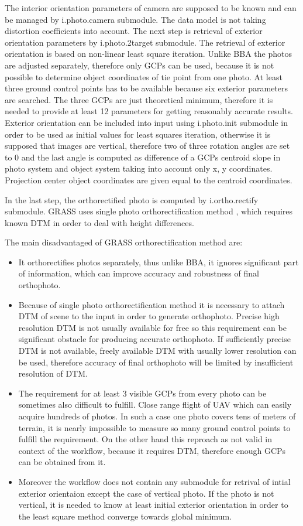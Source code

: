 \documentclass[a4paper,12pt]{article}
\begin{document}
The interior orientation parameters of camera are supposed to be known and can 
be managed by i.photo.camera submodule.
The data model is not taking distortion 
coefficients into account. 
The next step is retrieval of exterior orientation parameters by i.photo.2target submodule.  
The retrieval 
of exterior orientation is based on non-linear least square iteration. Unlike BBA
the photos are adjusted separately, therefore only GCPs can be used,
because it is not possible to determine object coordinates of tie point from one photo.
At least three ground control points has to be available because six exterior parameters are 
searched. The three GCPs are just theoretical minimum, therefore it is needed to provide at least 12 parameters
for getting reasonably accurate results. Exterior orientation 
can be included into input using i.photo.init submodule in order to be used as initial values for least squares iteration,
otherwise it is supposed that images are vertical, therefore two of three rotation
angles are set to 0 and the last angle is computed as difference of a GCPs centroid  slope
in photo system and object system taking into account only x, y coordinates.
Projection center object coordinates are given equal to the centroid coordinates.

In the last step, the orthorectified photo is computed by i.ortho.rectify submodule. GRASS uses single photo orthorectification
method \label{sec:single_ortho}, which requires known DTM in order to deal with height differences. 

The main disadvantaged of GRASS orthorectification method are:
\begin{itemize}
\item It orthorectifies photos separately, thus unlike BBA, it ignores significant part of information,
 which can improve accuracy and robustness of final orthophoto. 
\item Because of single photo orthorectification method it is necessary to attach DTM of scene to the input 
in order to generate orthophoto. Precise high resolution DTM is not usually available for free so this 
requirement can be significant obstacle for producing accurate orthophoto. If sufficiently precise 
DTM is not available, freely available DTM with usually lower resolution can be used, therefore  
accuracy of final orthophoto will be limited by insufficient resolution of DTM.
\item The requirement for at least 3 visible GCPs from every photo can be sometimes also difficult to fulfill.
Close range flight of UAV which can easily acquire hundreds of photos.
In such a case one photo covers tens of meters
of terrain, it is nearly impossible to measure so many ground control points to fulfill the requirement. 
On the other hand this reproach as not valid in context of the workflow, because it requires DTM, therefore 
enough GCPs can be obtained from it.
\item Moreover the workflow does not contain any submodule for retrival of intial exterior orientaion except
 the case of vertical photo.   If the photo 
is not vertical, it is needed to know at least initial exterior orientation 
in order to the least square method converge towards global minimum.
\end{itemize}
\end{document}
